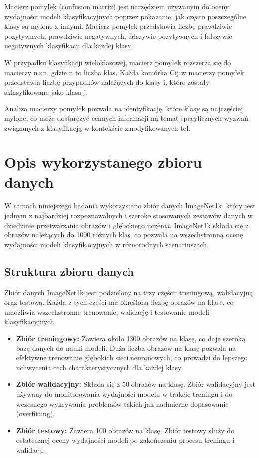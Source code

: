 Macierz pomyłek (confusion matrix) jest narzędziem używanym do oceny wydajności modeli klasyfikacyjnych poprzez 
pokazanie, jak często poszczególne klasy są mylone z innymi. Macierz pomyłek przedstawia liczbę prawdziwie pozytywnych, 
prawdziwie negatywnych, fałszywie pozytywnych i fałszywie negatywnych klasyfikacji dla każdej klasy.

W przypadku klasyfikacji wieloklasowej, macierz pomyłek rozszerza się do macierzy n×n, gdzie n to liczba klas. 
Każda komórka Cij​ w macierzy pomyłek przedstawia liczbę przypadków należących do klasy i, które zostały 
sklasyfikowane jako klasa j.

Analiza macierzy pomyłek pozwala na identyfikację, które klasy są najczęściej mylone, co może dostarczyć cennych 
informacji na temat specyficznych wyzwań związanych z klasyfikacją w kontekście zmodyfikowanych teł.

\section*{Opis wykorzystanego zbioru danych}

W ramach niniejszego badania wykorzystano zbiór danych ImageNet1k, który jest jednym z najbardziej rozpoznawalnych i 
szeroko stosowanych zestawów danych w dziedzinie przetwarzania obrazów i głębokiego uczenia. ImageNet1k składa się z 
obrazów należących do 1000 różnych klas, co pozwala na wszechstronną ocenę wydajności modeli klasyfikacyjnych w 
różnorodnych scenariuszach.

\subsection*{Struktura zbioru danych}

Zbiór danych ImageNet1k jest podzielony na trzy części: treningową, walidacyjną oraz testową. Każda z tych części ma 
określoną liczbę obrazów na klasę, co umożliwia wszechstronne trenowanie, walidację i testowanie modeli klasyfikacyjnych.

\begin{itemize}
    \item \textbf{Zbiór treningowy:} Zawiera około 1300 obrazów na klasę, co daje szeroką bazę danych do nauki modeli. 
    Duża liczba obrazów na klasę pozwala na efektywne trenowanie głębokich sieci neuronowych, co prowadzi do lepszego 
    uchwycenia cech charakterystycznych dla każdej klasy.
    \item \textbf{Zbiór walidacyjny:} Składa się z 50 obrazów na klasę. Zbiór walidacyjny jest używany do monitorowania 
    wydajności modelu w trakcie treningu i do wczesnego wykrywania problemów takich jak nadmierne dopasowanie 
    (overfitting).
    \item \textbf{Zbiór testowy:} Zawiera 100 obrazów na klasę. Zbiór testowy służy do ostatecznej oceny wydajności 
    modeli po zakończeniu procesu treningu i walidacji.
\end{itemize}


